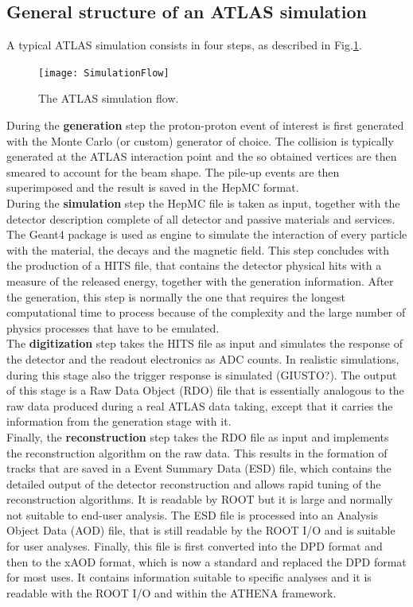 \documentclass[a4paper,twoside,12pt]{article}
\begin{document}
\subsection{General structure of an ATLAS simulation}
A typical ATLAS simulation consists in four steps, as described in Fig.\ref{fig:simulationFlow}.

\begin{figure} [h]
	\texttt{[image: SimulationFlow]}
	\caption{The ATLAS simulation flow. }
	\label{fig:simulationFlow}
\end{figure}

During the \textbf{generation} step the proton-proton event of interest is first generated with the Monte
Carlo (or custom) generator of choice. The collision is typically generated at the ATLAS 
interaction point and the so obtained vertices are then smeared to account for the beam 
shape. The pile-up events are then superimposed and
the result is saved in the HepMC format. \\

During the \textbf{simulation} step the HepMC file is taken as input, together with
the detector description complete of all detector and passive materials and services. 
The Geant4 package\cite{Geant4} is used as
engine to simulate the interaction of every particle with the material, the decays and the
magnetic field. This
step concludes with the production of a HITS file, that contains the detector physical hits
with a measure of the released energy, together with the generation information. After
the generation, this step 
is normally the one that requires the longest computational time to process because of the
complexity and the large number of physics processes that have to be emulated.\\

The \textbf{digitization} step takes the HITS file as input and simulates the response of the 
detector and the readout electronics as ADC counts. In realistic simulations, during this
stage also the trigger response is simulated (GIUSTO?). The output of this stage is a Raw Data
Object (RDO) file that is essentially analogous to the raw data produced during a real 
ATLAS data taking, except that it carries the information from the generation stage with it.\\

Finally, the \textbf{reconstruction} step takes the RDO file as input and implements
the reconstruction algorithm on the raw data. This results in the formation of tracks that are saved in a Event Summary Data (ESD) file, which contains the detailed output
of the detector reconstruction and allows rapid tuning of the reconstruction algorithms. It is readable by ROOT but it is large and normally not suitable
to end-user analysis\cite{ATLASFormats}. The ESD file is processed into an Analysis Object Data (AOD) file, that is
still readable by the ROOT I/O and is suitable for user analyses.  Finally, this file is first
converted
into the DPD format and then to the xAOD format\cite{xAOD}, which is now a standard and replaced the DPD format for most uses. It contains 
information suitable to specific analyses and it is readable with the ROOT I/O and within the
ATHENA framework\cite{Athena}.\\
\end{document}
